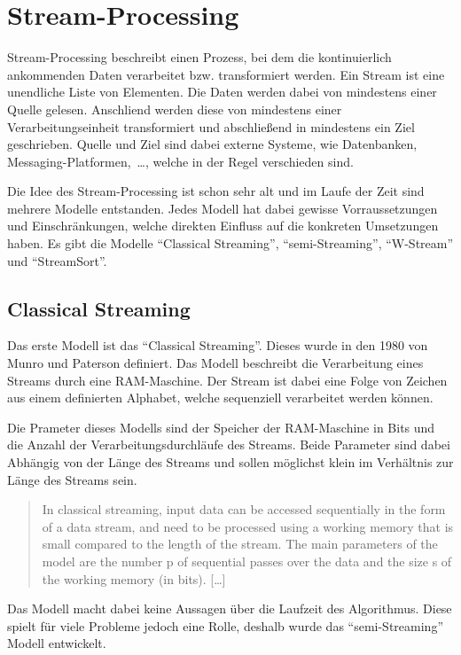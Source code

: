 \section{Stream-Processing}
Stream-Processing beschreibt einen Prozess, bei dem die kontinuierlich
ankommenden Daten verarbeitet bzw. transformiert werden. Ein Stream ist eine
unendliche Liste von Elementen. Die Daten werden dabei von mindestens einer
Quelle gelesen. Anschliend werden diese von mindestens einer Verarbeitungseinheit
transformiert und abschließend in mindestens ein Ziel geschrieben. Quelle und
Ziel sind dabei externe Systeme, wie Datenbanken, Messaging-Platformen,~\dots,
welche in der Regel verschieden sind.

Die Idee des Stream-Processing ist schon sehr alt und im Laufe der Zeit sind
mehrere Modelle entstanden. Jedes Modell hat dabei gewisse Vorraussetzungen
und Einschränkungen, welche direkten Einfluss auf die konkreten Umsetzungen
haben. Es gibt die Modelle \enquote{Classical Streaming}, \enquote{semi-Streaming},
\enquote{W-Stream} und \enquote{StreamSort}.

\subsection{Classical Streaming}
Das erste Modell ist das \enquote{Classical Streaming}. Dieses wurde in den
1980 von Munro und Paterson definiert. Das Modell beschreibt die Verarbeitung
eines Streams durch eine \gls{RAM}-Maschine. Der Stream ist dabei eine Folge von
Zeichen aus einem definierten Alphabet, welche sequenziell verarbeitet werden
können.

Die Prameter dieses Modells sind der Speicher der \gls{RAM}-Maschine in Bits und
die Anzahl der Verarbeitungsdurchläufe des Streams. Beide Parameter sind dabei
Abhängig von der Länge des Streams und sollen möglichst klein im Verhältnis zur
Länge des Streams sein.

\foreignblockquote{english}[\cite{Ribichini2007}]{
In classical streaming, input data can be accessed sequentially in the form
of a data stream, and need to be processed using a working memory that
is small compared to the length of the stream. The main parameters of the
model are the number p of sequential passes over the data and the size s of the
working memory (in bits). [\dots]
}

Das Modell macht dabei keine Aussagen über die Laufzeit des Algorithmus. Diese
spielt für viele Probleme jedoch eine Rolle, deshalb wurde das
\enquote{semi-Streaming} Modell entwickelt.

